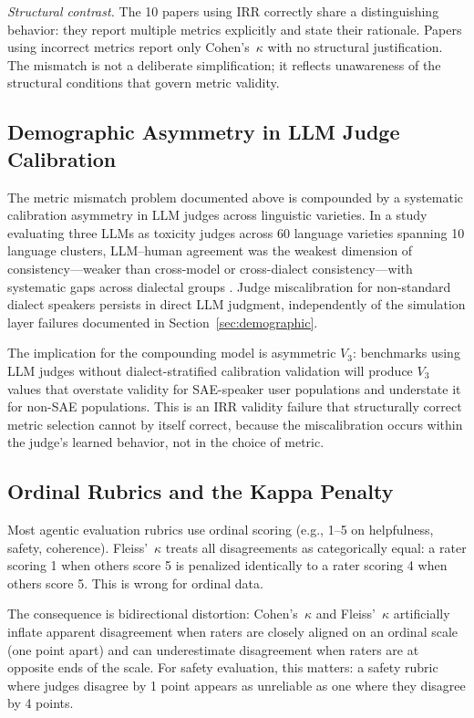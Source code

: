 \documentclass[preprint,12pt]{elsarticle}
\newcommand{\fk}{Fleiss'~$\kappa$}
\newcommand{\ck}{Cohen's~$\kappa$}
\begin{document}
\textit{Structural contrast.} The 10 papers using IRR correctly share a
distinguishing behavior: they report multiple metrics explicitly and state their
rationale. Papers using incorrect metrics report only \ck{} with no structural
justification. The mismatch is not a deliberate simplification; it reflects
unawareness of the structural conditions that govern metric validity.

\subsection{Demographic Asymmetry in LLM Judge Calibration}
\label{sec:judge-demographic}

The metric mismatch problem documented above is compounded by a systematic calibration
asymmetry in LLM judges across linguistic varieties. In a study evaluating three LLMs
as toxicity judges across 60 language varieties spanning 10 language clusters,
LLM--human agreement was the weakest dimension of consistency---weaker than
cross-model or cross-dialect consistency---with systematic gaps across dialectal
groups \citep{faisal2024}. Judge miscalibration for non-standard dialect speakers
persists in direct LLM judgment, independently of the simulation layer failures
documented in Section~\ref{sec:demographic}.

The implication for the compounding model is asymmetric $V_3$: benchmarks using LLM
judges without dialect-stratified calibration validation will produce $V_3$ values
that overstate validity for SAE-speaker user populations and understate it for
non-SAE populations. This is an IRR validity failure that structurally correct metric
selection cannot by itself correct, because the miscalibration occurs within the
judge's learned behavior, not in the choice of metric.

\subsection{Ordinal Rubrics and the Kappa Penalty}
\label{sec:kappa-penalty}

Most agentic evaluation rubrics use ordinal scoring (e.g., 1--5 on helpfulness,
safety, coherence). \fk{} treats all disagreements as categorically equal: a rater
scoring 1 when others score 5 is penalized identically to a rater scoring 4 when
others score 5. This is wrong for ordinal data.

The consequence is bidirectional distortion: \ck{} and \fk{} artificially inflate
apparent disagreement when raters are closely aligned on an ordinal scale (one point
apart) and can underestimate disagreement when raters are at opposite ends of the
scale. For safety evaluation, this matters: a safety rubric where judges disagree by
1 point appears as unreliable as one where they disagree by 4 points.
\end{document}
